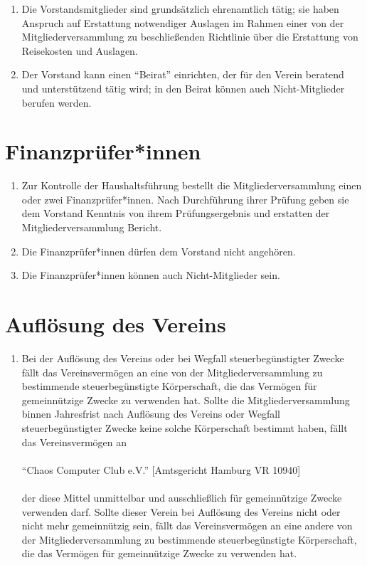 \documentclass[a4paper]{article}
\begin{document}
\begin{enumerate}
	\item Die Vorstandsmitglieder sind grundsätzlich ehrenamtlich tätig; sie haben Anspruch auf Erstattung notwendiger Auslagen im Rahmen einer von der Mitgliederversammlung zu beschließenden Richtlinie über die Erstattung von Reisekosten und Auslagen. 
	
	\item Der Vorstand kann einen \enquote{Beirat} einrichten, der für den Verein beratend und unterstützend tätig wird; in den Beirat können auch Nicht-Mitglieder berufen werden. 

\end{enumerate}

\section{Finanzprüfer*innen}
\begin{enumerate}
	\item Zur Kontrolle der Haushaltsführung bestellt die Mitgliederversammlung einen oder zwei Finanzprüfer*innen. Nach Durchführung ihrer Prüfung geben sie dem Vorstand Kenntnis von ihrem Prüfungsergebnis und erstatten der Mitgliederversammlung Bericht.
	\item Die Finanzprüfer*innen dürfen dem Vorstand nicht angehören. 
	\item Die Finanzprüfer*innen können auch Nicht-Mitglieder sein.
\end{enumerate}

\filbreak
\section{Auflösung des Vereins}
\begin{enumerate}
	\item Bei der Auflösung des Vereins oder bei Wegfall steuerbegünstigter Zwecke fällt das Vereinsvermögen an eine von der Mitgliederversammlung zu bestimmende steuerbegünstigte Körperschaft, die das Vermögen für gemeinnützige Zwecke zu verwenden hat. Sollte die Mitgliederversammlung binnen Jahresfrist nach Auflösung des Vereins oder Wegfall steuerbegünstigter Zwecke keine solche Körperschaft bestimmt haben, fällt das Vereinsvermögen an
	 \\
	 \\
	\enquote{Chaos Computer Club e.V.} [Amtsgericht Hamburg VR 10940]
	\\
	\\
	der diese Mittel unmittelbar und ausschließlich für gemeinnützige Zwecke verwenden darf. Sollte dieser Verein bei Auflösung des Vereins nicht oder nicht mehr gemeinnützig sein, fällt das Vereinsvermögen an eine andere von der Mitgliederversammlung zu bestimmende steuerbegünstigte Körperschaft, die das Vermögen für gemeinnützige Zwecke zu verwenden hat.
\end{enumerate}
\end{document}
